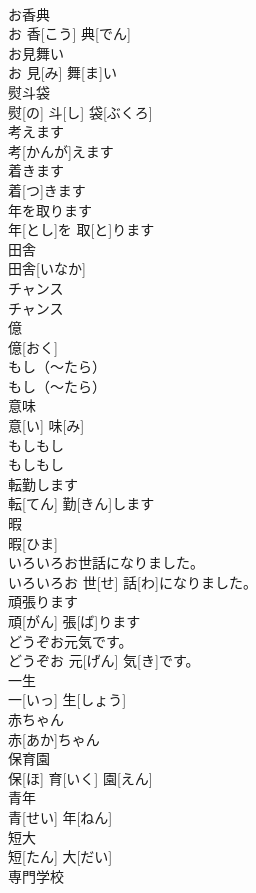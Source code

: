 \documentclass[8pt]{extreport}
\begin{document}
\begin{CJK}{UTF8}{min}
\\	お香典	
\\	お 香[こう] 典[でん]		
\\	お見舞い	
\\	お 見[み] 舞[ま]い		
\\	熨斗袋	
\\	熨[の] 斗[し] 袋[ぶくろ]		
\\	考えます	
\\	考[かんが]えます		
\\	着きます	
\\	着[つ]きます		
\\	年を取ります	
\\	年[とし]を 取[と]ります		
\\	田舎	
\\	田舎[いなか]		
\\	チャンス	
\\	チャンス		
\\	億	
\\	億[おく]		
\\	もし（～たら）	
\\	もし（～たら）		
\\	意味	
\\	意[い] 味[み]		
\\	もしもし	
\\	もしもし		
\\	転勤します	
\\	転[てん] 勤[きん]します		
\\	暇	
\\	暇[ひま]		
\\	いろいろお世話になりました。	
\\	いろいろお 世[せ] 話[わ]になりました。		
\\	頑張ります	
\\	頑[がん] 張[ば]ります		
\\	どうぞお元気です。	
\\	どうぞお 元[げん] 気[き]です。		
\\	一生	
\\	一[いっ] 生[しょう]		
\\	赤ちゃん	
\\	赤[あか]ちゃん		
\\	保育園	
\\	保[ほ] 育[いく] 園[えん]		
\\	青年	
\\	青[せい] 年[ねん]		
\\	短大	
\\	短[たん] 大[だい]		
\\	専門学校	

\end{CJK}
\end{document}
